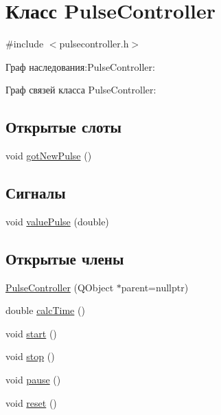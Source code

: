 \hypertarget{class_pulse_controller}{}\section{Класс Pulse\+Controller}
\label{class_pulse_controller}


{\ttfamily \#include $<$pulsecontroller.\+h$>$}



Граф наследования\+:Pulse\+Controller\+:


Граф связей класса Pulse\+Controller\+:
\subsection*{Открытые слоты}
\begin{DoxyCompactItemize}
\item 
void \hyperlink{class_pulse_controller_ada3a07fc7a533e76d0d91e2e8c31e75e}{got\+New\+Pulse} ()
\end{DoxyCompactItemize}
\subsection*{Сигналы}
\begin{DoxyCompactItemize}
\item 
void \hyperlink{class_pulse_controller_a165006a68ef3b02f3b25ee393d373ca0}{value\+Pulse} (double)
\end{DoxyCompactItemize}
\subsection*{Открытые члены}
\begin{DoxyCompactItemize}
\item 
\hyperlink{class_pulse_controller_aa17fed7626e6483413beff386f0e532a}{Pulse\+Controller} (Q\+Object $\ast$parent=nullptr)
\item 
double \hyperlink{class_pulse_controller_aad89e956185b04ed12bd02056e4df743}{calc\+Time} ()
\item 
void \hyperlink{class_pulse_controller_a278aefbf7233ae529304a012c4690827}{start} ()
\item 
void \hyperlink{class_pulse_controller_abc95e9340203f77f78818f389bd99d3a}{stop} ()
\item 
void \hyperlink{class_pulse_controller_a310f792764a804b50a910eeb4e53a374}{pause} ()
\item 
void \hyperlink{class_pulse_controller_a0112f4a30c50e9254e8e264f5b1ba865}{reset} ()
\end{DoxyCompactItemize}
